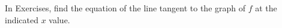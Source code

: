 \begin{exerciseset}{In Exercises}{, find the equation of the line tangent to the graph of $f$ at the indicated $x$ value.}



\end{exerciseset}
